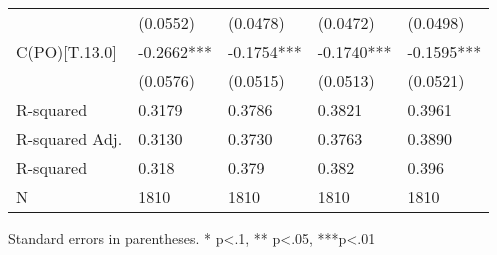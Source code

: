 \begin{table}
\begin{center}
\begin{tabular}{lllll}
                         & (0.0552)   & (0.0478)   & (0.0472)   & (0.0498)    \\
C(PO)[T.13.0]            & -0.2662*** & -0.1754*** & -0.1740*** & -0.1595***  \\
                         & (0.0576)   & (0.0515)   & (0.0513)   & (0.0521)    \\
R-squared                & 0.3179     & 0.3786     & 0.3821     & 0.3961      \\
R-squared Adj.           & 0.3130     & 0.3730     & 0.3763     & 0.3890      \\
R-squared                & 0.318      & 0.379      & 0.382      & 0.396       \\
N                        & 1810       & 1810       & 1810       & 1810        \\
\hline
\end{tabular}
\end{center}
\end{table}
\bigskip
Standard errors in parentheses. \newline 
* p<.1, ** p<.05, ***p<.01